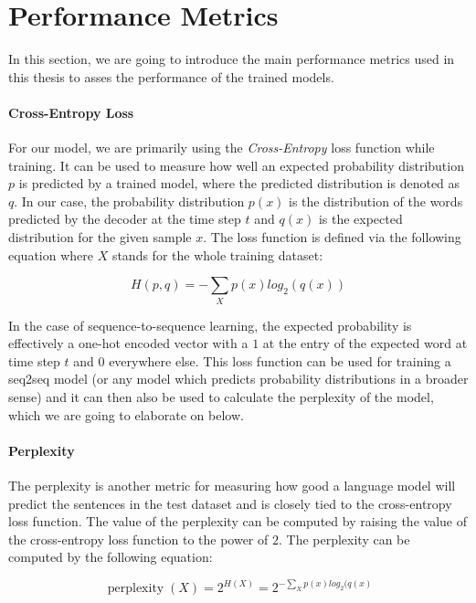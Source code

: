 \section{Performance Metrics}
In this section, we are going to introduce the main performance metrics used in this thesis to asses the performance of the trained models.

\paragraph{Cross-Entropy Loss} For our model, we are primarily using the \emph{Cross-Entropy} loss function while training. It can be used to measure how well an expected probability distribution $p$ is predicted by a trained model, where the predicted distribution is denoted as $q$. In our case, the probability distribution $p(x)$ is the distribution of the words predicted by the decoder at the time step $t$ and $q(x)$ is the expected distribution for the given sample $x$. The loss function is defined via the following equation where $X$ stands for the whole training dataset:

\begin{equation}
H(p, q) = - \sum_{X} p(x) log_2(q(x))
\end{equation}

In the case of sequence-to-sequence learning, the expected probability is effectively a one-hot encoded vector with a $1$ at the entry of the expected word at time step $t$ and $0$ everywhere else. This loss function can be used for training a seq2seq model (or any model which predicts probability distributions in a broader sense) and it can then also be used to calculate the perplexity of the model, which we are going to elaborate on below.

\paragraph{Perplexity} The perplexity is another metric for measuring how good a language model will predict the sentences in the test dataset and is closely tied to the cross-entropy loss function. The value of the perplexity can be computed by raising the value of the cross-entropy loss function to the power of $2$. The perplexity can be computed by the following equation:

\begin{equation}
\operatorname{perplexity}(X) = 2^{H(X)} = 2^{- \sum_{X} p(x) log_2(q(x)}
\end{equation}

